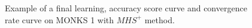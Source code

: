 \begin{appendices}
\begin{figure}[H]
\begin{subfigure}{0.40\textwidth}
{                    }
                    \caption{}
                    \label{fig:monks_1_ACC_CGD}
                \end{subfigure}
                \begin{subfigure}{0.40\textwidth}
                    \caption{}
                    \label{fig:monks_1_NORM_CGD}
                \end{subfigure}
                \caption{Example of a final learning, accuracy score curve and
                convergence rate curve on MONKS 1 with $MHS^+$ method.}
                \label{fig:monks_1_CGD}
            \end{figure}


\end{appendices}
